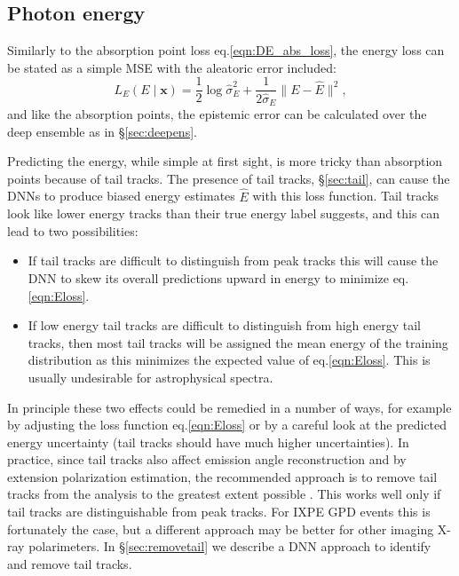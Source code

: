 \subsection{Photon energy}
Similarly to the absorption point loss eq.\ref{eqn:DE_abs_loss}, the energy loss can be stated as a simple MSE with the aleatoric error included:
\begin{equation}
     \label{eqn:Eloss}
    L_{E}(E \mid \mathbf{x}) = \frac{1}{2}\log\hat{\sigma}_E^2 + \frac{1}{2\hat{\sigma}_E}\big\|
    E
    - \hat{E}\big\|^2,
\end{equation}
and like the absorption points, the epistemic error can be calculated over the deep ensemble as in \S\ref{sec:deepens}.

Predicting the energy, while simple at first sight, is more tricky than absorption points because of tail tracks.
The presence of tail tracks, \S\ref{sec:tail}, can cause the DNNs to produce biased energy estimates $\hat{E}$ with this loss function. Tail tracks look like lower energy tracks than their true energy label suggests, and this can lead to two possibilities:
\begin{itemize}
    \item If tail tracks are difficult to distinguish from peak tracks this will cause the DNN to skew its overall predictions upward in energy to minimize eq.\ref{eqn:Eloss}.
    \item If low energy tail tracks are difficult to distinguish from high energy tail tracks, then most tail tracks will be assigned the mean energy of the training distribution as this minimizes the expected value of eq.\ref{eqn:Eloss}. This is usually undesirable for astrophysical spectra.
\end{itemize}
In principle these two effects could be remedied in a number of ways, for example by adjusting the loss function eq.\ref{eqn:Eloss} \citep{peirson_deep_2021} or by a careful look at the predicted energy uncertainty (tail tracks should have much higher uncertainties).
In practice, since tail tracks also affect emission angle reconstruction and by extension polarization estimation, the recommended approach is to remove tail tracks from the analysis to the greatest extent possible \citep{peirson_towards_2021}. This works well only if tail tracks are distinguishable from peak tracks. For IXPE GPD events this is fortunately the case, but a different approach may be better for other imaging X-ray polarimeters. In \S\ref{sec:removetail} we describe a DNN approach to identify and remove tail tracks. \\

